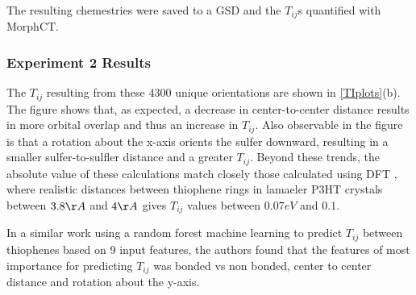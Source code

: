 The resulting chemestries were saved to a GSD and the $T_{ij}$s quantified with MorphCT. 

\subsubsection{Experiment 2 Results}

The $T_{ij}$ resulting from these 4300 unique orientations are shown in \autoref{TIplots}(b). 
The figure shows that, as expected, a decrease in 
center-to-center distance results in more orbital overlap and thus an increase in $T_{ij}$. 
Also observable in the figure is that
a rotation about the x-axis orients the sulfer downward, resulting in a smaller sulfer-to-sulfler distance 
and a greater $T_{ij}$. Beyond these trends, the absolute value of these calculations match closely those
calculated using DFT \cite{Lan2008}, where realistic distances between thiophene rings in lamaeler P3HT
crystals between $3.8\AA$ and $4 \AA$ gives $T_{ij}$ values between $0.07eV$ and $0.1$. 

In a similar work using a random forest machine learning to predict $T_{ij}$
between thiophenes based on 9 input features, the authors found that the
features of most importance for predicting $T_{ij}$ was bonded vs non bonded,
center to center distance and rotation about the y-axis. \cite{Jankowski2019c}

